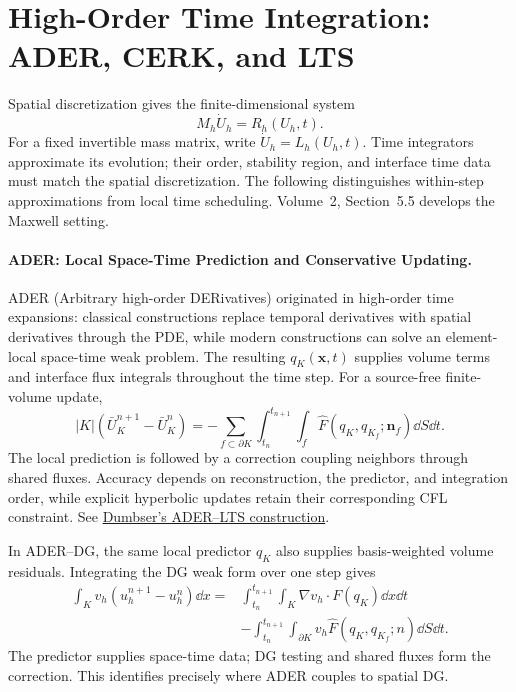 \section{High-Order Time Integration: ADER, CERK, and LTS}\label{sec:v1-time}
Spatial discretization gives the finite-dimensional system
\[
M_h\dot U_h=R_h(U_h,t).
\]
For a fixed invertible mass matrix, write $\dot U_h=L_h(U_h,t)$.
Time integrators approximate its evolution; their order, stability region, and interface time data must match the spatial discretization.
The following distinguishes within-step approximations from local time scheduling. Volume~2, Section~5.5 develops the Maxwell setting.

\paragraph{ADER: Local Space-Time Prediction and Conservative Updating.}
ADER (Arbitrary high-order DERivatives) originated in high-order time expansions:
classical constructions replace temporal derivatives with spatial derivatives through the PDE, while modern constructions can solve an element-local space-time weak problem.
The resulting $q_K(\bm x,t)$ supplies volume terms and interface flux integrals throughout the time step.
For a source-free finite-volume update,
\[
|K|(\bar U_K^{n+1}-\bar U_K^n)
=-\sum_{f\subset\partial K}\int_{t_n}^{t_{n+1}}\int_f
\widehat F(q_K,q_{K_f};\bm n_f)\dd S\dd t.
\]
The local prediction is followed by a correction coupling neighbors through shared fluxes. Accuracy depends on reconstruction, the predictor, and integration order, while explicit hyperbolic updates retain their corresponding CFL constraint.
See \href{https://doi.org/10.1016/j.cma.2014.07.019}{Dumbser's ADER--LTS construction}.

In ADER--DG, the same local predictor $q_K$ also supplies basis-weighted volume residuals.
Integrating the DG weak form over one step gives
\[
\begin{aligned}
\int_Kv_h(u_h^{n+1}-u_h^n)\dd x
={}&\int_{t_n}^{t_{n+1}}\int_K\nabla v_h\cdot F(q_K)\dd x\dd t\\
&-\int_{t_n}^{t_{n+1}}\int_{\partial K}v_h\widehat F(q_K,q_{K_f};n)\dd S\dd t.
\end{aligned}
\]
The predictor supplies space-time data; DG testing and shared fluxes form the correction. This identifies precisely where ADER couples to spatial DG.

